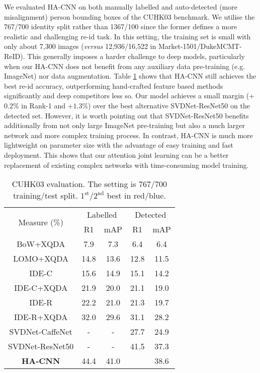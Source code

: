 \documentclass[10pt,twocolumn,letterpaper]{article}
\begin{document}
\vspace{0.05cm}
We evaluated HA-CNN on both manually labelled and 
auto-detected (more misalignment) person bounding boxes of the CUHK03 benchmark. 
We utilise the 767/700 identity split rather than 1367/100 since the former defines a more realistic and challenging re-id task.
In this setting, the training set is small with only about 7,300 images ({\em versus} 12,936/16,522 in Market-1501/DukeMCMT-ReID).
This generally imposes a harder challenge to deep models, particularly 
when our HA-CNN does not benefit from any auxiliary data pre-training
(e.g. ImageNet) nor data augmentation.
Table \ref{tab:res_cuhk03} shows that HA-CNN still achieves the best
re-id accuracy, outperforming hand-crafted feature based methods significantly
and deep competitors less so.
Our model achieves a small margin (+$0.2\%$ in Rank-1 and +$1.3\%$) over 
the best alternative SVDNet-ResNet50 on the detected set.
However, it is worth pointing out that SVDNet-ResNet50 benefits
additionally from not only large ImageNet pre-training but also a much
larger network and more complex training process. 
In contrast, HA-CNN is much more lightweight on parameter size with the advantage of easy training and fast deployment.   
This shows that our attention joint learning can be a better replacement of 
existing complex networks with time-consuming model training.


\begin{table} [!t]
	\centering
\renewcommand{\arraystretch}{1}
	\setlength{\tabcolsep}{0.2cm}
\caption{CUHK03 evaluation. The setting is 767/700 training/test split.
		$1^\text{st}/2^\text{nd}$ best in red/blue.
	}
\begin{tabular}{|c|cc|cc|}
		\hline
		\multirow{2}{*}{Measure (\%)}
		&  \multicolumn{2}{c|}{Labelled} &\multicolumn{2}{c|}{Detected} \\ \cline{2-5}
		
		& R1 & mAP & R1 & mAP  \\ \hline \hline
		BoW+XQDA \cite{wang2016highly} &  7.9 &  7.3 &  6.4 &  6.4\\   LOMO+XQDA \cite{liao2015person} &  14.8 &  13.6 &  12.8 &  11.5\\   \hline
IDE-C \cite{zhong2017re} &  15.6 &  14.9 &  15.1 &  14.2\\   IDE-C+XQDA \cite{zhong2017re}&  21.9 &  20.0 &  21.1 &  19.0\\   IDE-R \cite{zhong2017re}& 22.2 &  21.0 &  21.3 &19.7 \\   IDE-R+XQDA \cite{zhong2017re} &  \color{blue}32.0 & \color{blue} 29.6 &  31.1 &  28.2\\   SVDNet-CaffeNet \cite{sun2017svdnet} &  - &  -  &  27.7  &  24.9 \\ 
		SVDNet-ResNet50 \cite{sun2017svdnet} &  - &  -  &  \color{blue} {41.5} &  \color{blue} {37.3} \\ 
		\hline
{\bf HA-CNN} &  \color{red} {44.4} &  \color{red} {41.0}  & \color{red}{41.7} &   \color{red} {38.6}  \\ 
		\hline
	\end{tabular}\label{tab:res_cuhk03}
\end{table}
\end{document}
